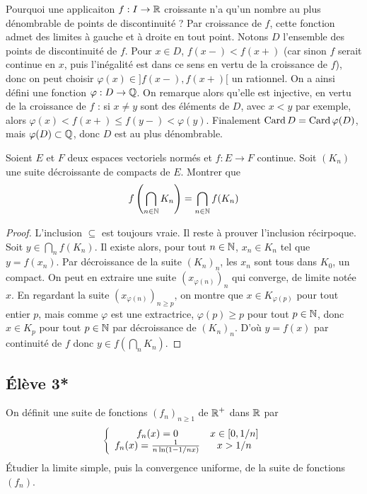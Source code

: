 \documentclass[10pt]{scrartcl}
\begin{document}
    \begin{remarks}
        Pourquoi une applicaiton $f:I\to\operatorname{\mathbb R}$ croissante n'a qu'un nombre au plus dénombrable de points de discontinuité ?
        Par croissance de $f$, cette fonction admet des limites à gauche et à droite en tout point.
        Notons $D$ l'ensemble des points de discontinuité de $f$. 
        Pour $x\in D$, $f(x-)<f(x+)$ (car sinon $f$ serait continue en $x$, puis l'inégalité est dans ce sens en vertu de la croissance de $f$), donc on peut choisir $\varphi(x)\in]f(x-),f(x+)[$ un rationnel. 
        On a ainsi défini une fonction $\varphi:D\to \operatorname{\mathbb Q}$. On remarque alors qu'elle est injective, en vertu de la croissance de $f$ : si $x\neq y$ sont des éléments de $D$, avec $x<y$ par exemple, alors $\varphi(x)<f(x+)\leq f(y-)<\varphi(y)$. 
        Finalement $\operatorname{Card} D=\operatorname{Card}\varphi(D)$, mais $\varphi(D)\subset \operatorname{\mathbb Q}$, donc $D$ est au plus dénombrable.
    \end{remarks}
    
    \begin{exo}
       Soient $E$ et $F$ deux espaces vectoriels normés et $f:E\to F$ continue. 
       Soit $(K_n)$ une suite décroissante de compacts de $E$. Montrer que 
       \[
            f\left(\bigcap_{n\in\operatorname{\mathbb N}}K_n\right)=\bigcap_{n\in\operatorname{\mathbb N}}f(K_n)
       \]
    \end{exo}

    \begin{proof}
        L'inclusion $\subseteq$ est toujours vraie. Il reste à prouver l'inclusion récirpoque. 
        Soit $y\in\bigcap_nf(K_n)$. 
        Il existe alors, pour tout $n\in\operatorname{\mathbb N}$, $x_n\in K_n$ tel que $y=f(x_n)$. 
        Par décroissance de la suite $(K_n)_n$, les $x_n$ sont tous dans $K_0$, un compact. 
        On peut en extraire une suite $(x_{\varphi(n)})_n$ qui converge, de limite notée $x$. 
        En regardant la suite $(x_{\varphi(n)})_{n\geq p}$, on montre que $x\in K_{\varphi(p)}$ pour tout entier $p$, mais comme $\varphi$ est une extractrice, $\varphi(p)\geq p$ pour tout $p\in\operatorname{\mathbb N}$, donc $x\in K_p$ pour tout $p\in\operatorname{\mathbb N}$ par décroissance de $(K_n)_n$. 
        D'où $y=f(x)$ par continuité de $f$ donc $y\in f\left(\bigcap_nK_n\right)$.
    \end{proof}

    \subsection*{Élève 3*}

    \begin{exo}
       On définit une suite de fonctions $(f_n)_{n\geq 1}$ de $\operatorname{\mathbb R}^+$ dans $\operatorname{\mathbb R}$ par 
       \[
            \left\lbrace\begin{array}{c c}f_n(x)=0 & x\in[0,1/n]\\ f_n(x)=\frac1{n\ln(1-1/nx)} & x > 1/n\end{array}\right.
       \]
       Étudier la limite simple, puis la convergence uniforme, de la suite de fonctions $(f_n)$.
    \end{exo}
\end{document}
